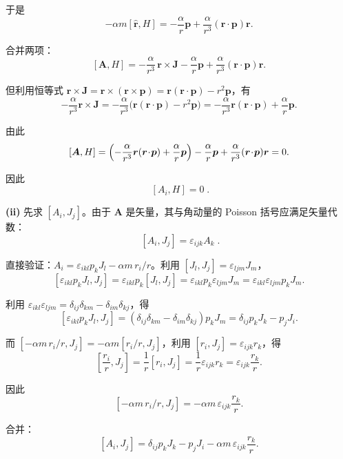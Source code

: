 \begin{question}
\begin{solution}
于是
\[
-\alpha m[\hat{\boldsymbol r}, H] = -\frac{\alpha}{r}\boldsymbol p
+ \frac{\alpha}{r^3}(\boldsymbol r\!\cdot\!\boldsymbol p)\boldsymbol r.
\]

合并两项：
\[
[\boldsymbol A, H] = -\frac{\alpha}{r^3}\,\boldsymbol r \times \boldsymbol J
- \frac{\alpha}{r}\boldsymbol p + \frac{\alpha}{r^3}(\boldsymbol r\!\cdot\!\boldsymbol p)\boldsymbol r.
\]

但利用恒等式 \(\boldsymbol r \times \boldsymbol J = \boldsymbol r \times (\boldsymbol r \times \boldsymbol p)
= \boldsymbol r(\boldsymbol r\!\cdot\!\boldsymbol p) - r^2\boldsymbol p\)，有
\[
-\frac{\alpha}{r^3}\boldsymbol r \times \boldsymbol J
= -\frac{\alpha}{r^3}\bigl(\boldsymbol r(\boldsymbol r\!\cdot\!\boldsymbol p) - r^2\boldsymbol p\bigr)
= -\frac{\alpha}{r^3}\boldsymbol r(\boldsymbol r\!\cdot\!\boldsymbol p) + \frac{\alpha}{r}\boldsymbol p.
\]

由此
\[
[\boldsymbol A, H] = \Bigl(-\frac{\alpha}{r^3}\boldsymbol r(\boldsymbol r\!\cdot\!\boldsymbol p)
+ \frac{\alpha}{r}\boldsymbol p\Bigr)
- \frac{\alpha}{r}\boldsymbol p + \frac{\alpha}{r^3}(\boldsymbol r\!\cdot\!\boldsymbol p)\boldsymbol r = 0.
\]

因此
\[
\boxed{\;[A_i, H] = 0\;}.
\]

\vspace{0.5em}
\textbf{(ii)} 先求 \([A_i, J_j]\)。由于 \(\boldsymbol A\) 是矢量，其与角动量的 Poisson 括号应满足矢量代数：
\[
\boxed{\;[A_i, J_j] = \varepsilon_{ijk} A_k\;}.
\]

直接验证：\(A_i = \varepsilon_{ikl}p_k J_l - \alpha m\, r_i/r\)。利用 \([J_l, J_j] = \varepsilon_{ljm}J_m\)，
\[
[\varepsilon_{ikl}p_k J_l, J_j] = \varepsilon_{ikl}p_k [J_l, J_j]
= \varepsilon_{ikl}p_k \varepsilon_{ljm} J_m
= \varepsilon_{ikl}\varepsilon_{ljm} p_k J_m.
\]

利用 \(\varepsilon_{ikl}\varepsilon_{ljm} = \delta_{ij}\delta_{km} - \delta_{im}\delta_{kj}\)，得
\[
[\varepsilon_{ikl}p_k J_l, J_j] = (\delta_{ij}\delta_{km} - \delta_{im}\delta_{kj}) p_k J_m
= \delta_{ij}p_k J_k - p_j J_i.
\]

而 \([-\alpha m\, r_i/r, J_j] = -\alpha m [r_i/r, J_j]\)，利用 \([r_i, J_j] = \varepsilon_{ijk}r_k\)，得
\[
\left[\frac{r_i}{r}, J_j\right] = \frac{1}{r}[r_i, J_j] = \frac{1}{r}\varepsilon_{ijk}r_k
= \varepsilon_{ijk}\frac{r_k}{r}.
\]

因此
\[
[-\alpha m\, r_i/r, J_j] = -\alpha m\,\varepsilon_{ijk}\frac{r_k}{r}.
\]

合并：
\[
[A_i, J_j] = \delta_{ij}p_k J_k - p_j J_i - \alpha m\,\varepsilon_{ijk}\frac{r_k}{r}.
\]


\end{solution}
\end{question}

